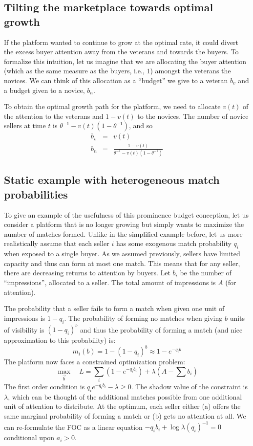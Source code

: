\subsection{Tilting the marketplace towards optimal growth}
If the platform wanted to continue to grow at the optimal rate, it
could divert the excess buyer attention away from the veterans and
towards the buyers. To formalize this intuition, let us imagine that
we are allocating the buyer attention (which as the same measure as
the buyers, i.e., $1$) amongst the veterans the novices. We can think
of this allocation as a ``budget'' we give to a veteran $b_v$ and a
budget given to a novice, $b_n$.

To obtain the optimal growth path for the platform, we need to
allocate $v(t)$ of the attention to the veterans and $1-v(t)$ to the
novices. The number of novice sellers at time $t$ is $\theta^{-1} -
v(t)\left(1 - \theta^{-1}\right)$, and so
\begin{eqnarray}
b_v &=& v(t) \nonumber\\
b_n &=& \frac{1-v(t)}{\theta^{-1} - v(t)\left(1 - \theta^{-1}\right)}
\end{eqnarray} 

\subsection{Static example with heterogeneous match probabilities}
To give an example of the usefulness of this prominence budget
conception, let us consider a platform that is no longer growing but
simply wants to maximize the number of matches formed. Unlike in the
simplified example before, let us more realistically assume that each
seller $i$ has some exogenous match probability $q_i$ when exposed to
a single buyer. As we assumed previously, sellers have limited
capacity and thus can form at most one match. This means that for any
seller, there are decreasing returns to attention by buyers. Let $b_i$
be the number of ``impressions'', allocated to a seller. The total
amount of impressions is $A$ (for attention).

The probability that a seller fails to form a match when given one
unit of impressions is $1-q_i$. The probability of forming no matches
when giving $b$ units of visibility is $(1-q_i)^b$ and thus the
probability of forming a match (and nice approximation to this
probability) is:
\begin{equation} 
m_i(b) = 1 - (1 - q_i)^{b} \approx 1 - e^{-q_i b}
\end{equation} 
The platform now faces a constrained optimization problem:  
\begin{equation}
\max_{\vec{b}} \quad L = \sum_i \left(1 - e^{-q_i b_i}\right) + \lambda \left(A - \sum b_i\right) 
\end{equation} 
The first order condition is $q_i e^{-q_i b_i} - \lambda \ge 0$. The
shadow value of the constraint is $\lambda$, which can be thought of
the additional matches possible from one additional unit of attention
to distribute. At the optimum, each seller either (a) offers the same
marginal probability of forming a match or (b) gets no attention at
all. We can re-formulate the FOC as a linear equation $-q_i b_i + \log
\lambda (q_i)^{-1} = 0$ conditional upon $a_i > 0$. 

